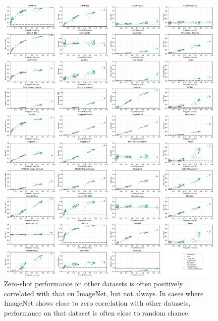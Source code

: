 \begin{figure}
    \centering
    \includegraphics[width=\linewidth]{figures/imagenet_vs_rest_breakdown.pdf}
    \caption{Zero-shot performance on other datasets is often positively correlated with that on ImageNet, but not always. In cases where ImageNet shows close to zero correlation with other datasets, performance on that dataset is often close to random chance.}
    \label{fig:imagenet-vs-all-breakdown}
\end{figure}
\thispagestyle{empty}


